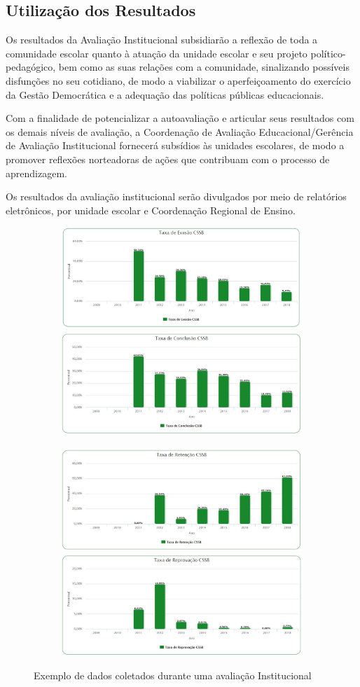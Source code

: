 \documentclass[final]{beamer}
\begin{document}
\begin{poster}
\section{Utilização dos Resultados}
Os resultados da Avaliação Institucional subsidiarão a reflexão de toda a comunidade escolar quanto à atuação da unidade escolar e seu projeto político-pedagógico, bem como as suas relações com a comunidade, sinalizando possíveis disfunções no seu cotidiano, de modo a viabilizar o aperfeiçoamento do exercício da Gestão Democrática e a adequação das políticas públicas educacionais.

Com a finalidade de potencializar a autoavaliação e articular seus resultados com os demais níveis de avaliação, a Coordenação de Avaliação Educacional/Gerência de Avaliação Institucional fornecerá subsídios às unidades escolares, de modo a promover reflexões norteadoras de ações que contribuam com o processo de aprendizagem.

Os resultados da avaliação institucional serão divulgados por meio de relatórios eletrônicos, por unidade escolar e Coordenação Regional de Ensino.





\begin{figure}%
\begin{subfigure}{\textwidth}
\centering
\includegraphics[width=.45\columnwidth]{evasao}
\includegraphics[width=.45\columnwidth]{conclusao}
\end{subfigure}
\begin{subfigure}{\textwidth}
\centering
\includegraphics[width=.45\columnwidth]{retencao}
\includegraphics[width=.45\columnwidth]{reprovacao}
\end{subfigure}
\caption{Exemplo de dados coletados durante uma avaliação Institucional}
\end{figure}

%
%

\end{poster}
\end{document}
